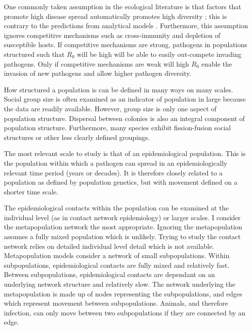 One commonly taken assumption in the ecological literature is that factors that promote high disease spread automatically promotes high diversity \cite{nunn2003comparative, morand2000wormy, poulin2014parasite, poulin2000diversity, altizer2003social}; this is contrary to the predictions from analytical models \cite{qiu2013vector, allen2004sis, nunes2006localized}. 
Furthermore, this assumption ignores competitive mechanisms such as cross-immunity and depletion of susceptible hosts.
If competitive mechanisms are strong, pathogens in populations structured such that $R_0$ will be high will be able to easily out-compete invading pathogens.
Only if competitive mechanisms are weak will high $R_0$  enable the invasion of new pathogens and allow higher pathogen diversity.


How structured a population is can be defined in many ways on many scales.
Social group size is often examined as an indicator of population in large because the data are readily available.
However, group size is only one aspect of population structure.
Dispersal between colonies is also an integral component of population structure.
Furthermore, many species exhibit fission-fusion social structures or other less clearly defined groupings.

The most relevant scale to study is that of an epidemiological population.
This is the population within which a pathogen can spread in an epidemiologically relevant time period (years or decades).
It is therefore closely related to a population as defined by population genetics, but with movement defined on a shorter time scale.

The epidemiological contacts within the population can be examined at the individual level (as in contact network epidemiology) or larger scales.
I consider the metapopulation network the most appropriate.
Ignoring the metapopulation assumes a fully mixed population which is unlikely.
Trying to study the contact network relies on detailed individual level detail which is not available.
Metapopulation models consider a network of small subpopulations. 
Within subpopulations, epidemiological contacts are fully mixed and relatively fast.
Between subpopulations, epidemiological contacts are dependant on an underlying network structure and relatively slow.
The network underlying the metapopulation is made up of nodes representing the subpopulations, and edges which represent movement between subpopulations.
Animals, and therefore infection, can only move between two subpopulations if they are connected by an edge.

